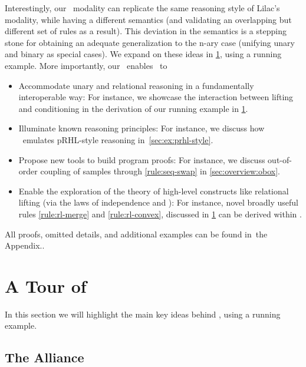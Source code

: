 \documentclass[acmsmall,nonacm,screen,appendix]{acmart}
\begin{document}
Interestingly, our \supercond\ modality can replicate the same reasoning
style of Lilac's modality, while having a different semantics
(and validating an overlapping but different set of rules as a result).
This deviation in the semantics is a stepping stone for obtaining an
adequate generalization to the \pre n-ary case (unifying unary and binary as special cases).
We expand on these ideas in \cref{sec:overview}, using a running example.
More importantly, our \supercond\  enables \thelogic\ to
\begin{itemize}
\item Accommodate unary and relational reasoning
  in a fundamentally interoperable way: For instance, we showcase the interaction between lifting and conditioning in the derivation of our running example in \cref{sec:overview}.
\item Illuminate known reasoning principles: For instance, we discuss how \thelogic\ emulates pRHL-style reasoning
  in~\cref{sec:ex:prhl-style}.
\item Propose new tools to build program proofs: For instance, we discuss out-of-order coupling of samples through \ref{rule:seq-swap} in \cref{sec:overview:obox}.\item Enable the exploration of the theory of high-level constructs
   like relational lifting (via the laws of independence and \supercond): For instance, novel broadly useful rules \ref{rule:rl-merge} and \ref{rule:rl-convex}, discussed in \cref{sec:overview} can be derived within \thelogic.
\end{itemize}
All proofs, omitted details, and additional examples can be found in~\ifappendix the Appendix.\else\cite{fullversion}.\fi  \ifappendix\pagebreak\fi
\section{A Tour of \thelogic}
\label{sec:overview}



In this section we will highlight the main key ideas behind
\thelogic, using a running example.

\subsection{The Alliance}
\label{sec:overview:intro}
\end{document}
